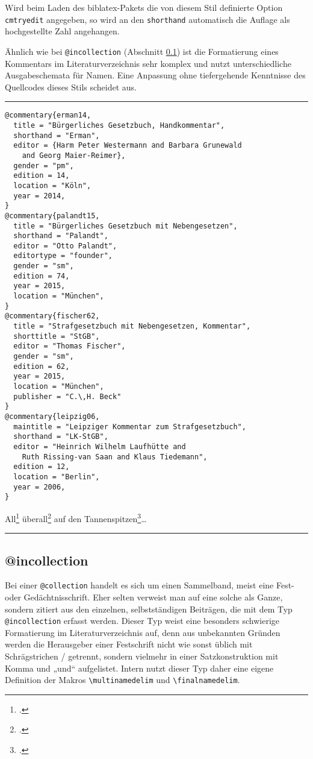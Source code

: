 \documentclass[11pt,a4paper,DIV=calc]{scrartcl}
\newcommand\software[1]{\textsf{#1}}
\newenvironment{rubexample}{\par\vspace{\baselineskip}\hrule\par\begin{refsection}}{\end{refsection}\par\hrule\par\vspace{\baselineskip}}
\begin{document}
Wird beim Laden des \software{biblatex}-Pakets die von diesem Stil
definierte Option \verb+cmtryedit+ angegeben, so wird an den
\verb+shorthand+ automatisch die Auflage als hochgestellte Zahl
angehangen.

Ähnlich wie bei \verb+@incollection+ (Abschnitt
\ref{sec:incollection}) ist die Formatierung eines Kommentars im
Literaturverzeichnis sehr komplex und nutzt unterschiedliche
Ausgabeschemata für Namen. Eine Anpassung ohne tiefergehende
Kenntnisse des Quellcodes dieses Stils scheidet aus.

\begin{rubexample}
\begin{verbatim}
@commentary{erman14,
  title = "Bürgerliches Gesetzbuch, Handkommentar",
  shorthand = "Erman",
  editor = {Harm Peter Westermann and Barbara Grunewald
    and Georg Maier-Reimer},
  gender = "pm",
  edition = 14,
  location = "Köln",
  year = 2014,
}
@commentary{palandt15,
  title = "Bürgerliches Gesetzbuch mit Nebengesetzen",
  shorthand = "Palandt",
  editor = "Otto Palandt",
  editortype = "founder",
  gender = "sm",
  edition = 74,
  year = 2015,
  location = "München",
}
@commentary{fischer62,
  title = "Strafgesetzbuch mit Nebengesetzen, Kommentar",
  shorttitle = "StGB",
  editor = "Thomas Fischer",
  gender = "sm",
  edition = 62,
  year = 2015,
  location = "München",
  publisher = "C.\,H. Beck"
}
@commentary{leipzig06,
  maintitle = "Leipziger Kommentar zum Strafgesetzbuch",
  shorthand = "LK-StGB",
  editor = "Heinrich Wilhelm Laufhütte and
    Ruth Rissing-van Saan and Klaus Tiedemann",
  edition = 12,
  location = "Berlin",
  year = 2006,
}
\end{verbatim}

All\footcite[Ellenberger][\S\,12 Rnr. 7]{palandt15}
überall\footcite[Grunewald][\S\,12 Rnr. 6]{erman14}
auf den
Tannenspitzen\footcites[][\S\,242 Rnr. 10]{fischer62}[Laufhütte][\S\,242\,Rnr. 15]{leipzig06}\ldots

\printbibliography
\end{rubexample}

\subsection{@incollection}\label{sec:incollection}

Bei einer \verb+@collection+ handelt es sich um einen Sammelband,
meist eine Fest- oder Gedächtnisschrift. Eher selten verweist man auf
eine solche als Ganze, sondern zitiert aus den einzelnen,
selbstständigen Beiträgen, die mit dem Typ \verb+@incollection+
erfasst werden. Dieser Typ weist eine besonders schwierige
Formatierung im Literaturverzeichnis auf, denn aus unbekannten Gründen
werden die Herausgeber einer Festschrift nicht wie sonst üblich mit
Schrägstrichen / getrennt, sondern vielmehr in einer Satzkonstruktion
mit Komma und „und“ aufgelistet. Intern nutzt dieser Typ daher eine
eigene Definition der Makros \verb+\multinamedelim+ und
\verb+\finalnamedelim+.
\end{document}
